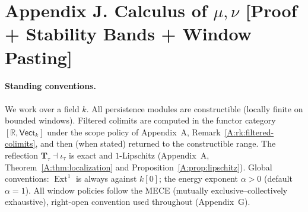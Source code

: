 \documentclass[11pt]{article}
\DeclareMathOperator{\Ext}{Ext}
\numberwithin{equation}{section}
\theoremstyle{definition}
\begin{document}
\section*{Appendix J. Calculus of $\mu,\nu$ [Proof + Stability Bands + Window Pasting]}
{}
\label{J:calc}

\paragraph{Standing conventions.}
We work over a field \(k\).
All persistence modules are constructible (locally finite on bounded windows).
Filtered colimits are computed in the functor category \([\mathbb{R},\mathsf{Vect}_k]\) under the scope policy of Appendix~A, Remark~\ref{A:rk:filtered-colimits}, and then (when stated) returned to the constructible range.
The reflection \(\mathbf{T}_\tau\dashv \iota_\tau\) is exact and \(1\)-Lipschitz (Appendix~A, Theorem~\ref{A:thm:localization} and Proposition~\ref{A:prop:lipschitz}).
Global conventions: \(\Ext^1\) is always against \(k[0]\); the energy exponent \(\alpha>0\) (default \(\alpha=1\)).
All window policies follow the MECE (mutually exclusive–collectively exhaustive), right-open convention used throughout (Appendix~G).
\end{document}
